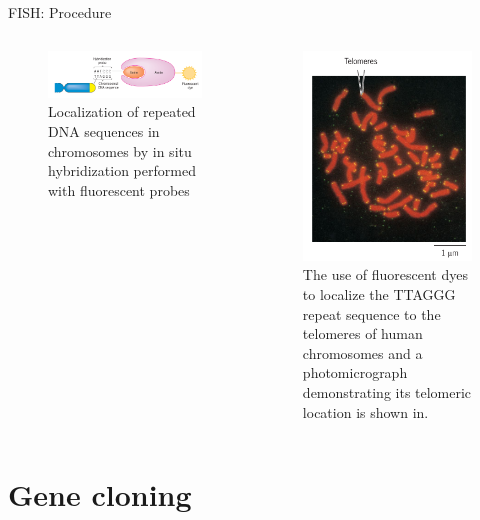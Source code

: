 \documentclass[
  ignorenonframetext,
  aspectratio=169]{beamer}
\begin{document}
\begin{frame}{FISH: Procedure}
\protect\hypertarget{fish-procedure}{}
\begin{columns}[T,onlytextwidth]

\begin{figure}
\includegraphics[width=0.8\linewidth]{./../images/fish_hybridization1} \caption{Localization of repeated DNA sequences in chromosomes by in situ hybridization performed with fluorescent probes}\label{fig:fish-hybridization1}
\end{figure}


\begin{figure}
\includegraphics[width=0.5\linewidth]{./../images/fish_hybridization2} \caption{The use of fluorescent dyes to localize the TTAGGG repeat sequence to the telomeres of human chromosomes and a photomicrograph demonstrating its telomeric location is shown in.}\label{fig:fish-hybridization2}
\end{figure}

\end{columns}
\end{frame}

\hypertarget{gene-cloning}{%
\section{Gene cloning}\label{gene-cloning}}
\end{document}
